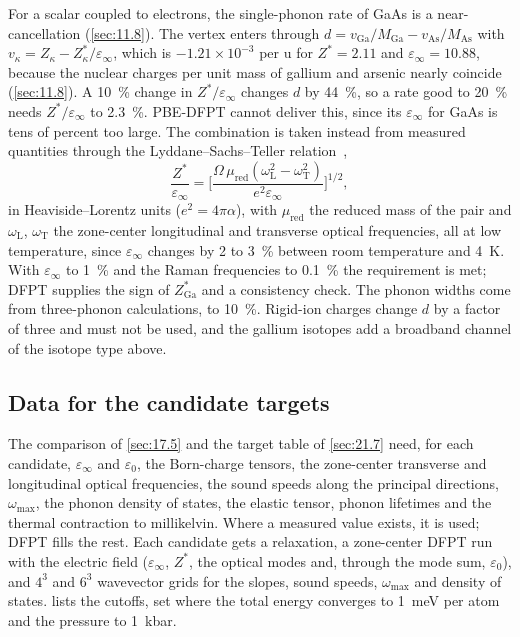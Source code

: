 For a scalar coupled to electrons, the single-phonon rate of GaAs is a near-cancellation (\cref{sec:11.8}). The vertex enters through $d = v_{\mathrm{Ga}}/M_{\mathrm{Ga}} - v_{\mathrm{As}}/M_{\mathrm{As}}$ with $v_\kappa = Z_\kappa - Z^*_\kappa/\varepsilon_\infty$, which is $-1.21\times10^{-3}$ per u for $Z^* = 2.11$ and $\varepsilon_\infty = 10.88$, because the nuclear charges per unit mass of gallium and arsenic nearly coincide (\cref{sec:11.8}). A \SI{10}{\percent} change in $Z^*/\varepsilon_\infty$ changes $d$ by \SI{44}{\percent}, so a rate good to \SI{20}{\percent} needs $Z^*/\varepsilon_\infty$ to \SI{2.3}{\percent}. PBE-DFPT cannot deliver this, since its $\varepsilon_\infty$ for GaAs is tens of percent too large. The combination is taken instead from measured quantities through the Lyddane--Sachs--Teller relation~\cite{lyddane1941polar},
\begin{equation}
  \frac{Z^*}{\varepsilon_\infty} = \Big[\frac{\Omega\,\mu_{\mathrm{red}}(\omega_{\mathrm{L}}^2 - \omega_{\mathrm{T}}^2)}{e^2\varepsilon_\infty}\Big]^{1/2} ,
  \label{eq:E.17-lst}
\end{equation}
in Heaviside--Lorentz units ($e^2 = 4\pi\alpha$), with $\mu_{\mathrm{red}}$ the reduced mass of the pair and $\omega_{\mathrm{L}}$, $\omega_{\mathrm{T}}$ the zone-center longitudinal and transverse optical frequencies, all at low temperature, since $\varepsilon_\infty$ changes by 2 to \SI{3}{\percent} between room temperature and \SI{4}{K}. With $\varepsilon_\infty$ to \SI{1}{\percent} and the Raman frequencies to \SI{0.1}{\percent} the requirement is met; DFPT supplies the sign of $Z^*_{\mathrm{Ga}}$ and a consistency check. The phonon widths come from three-phonon calculations, to \SI{10}{\percent}. Rigid-ion charges change $d$ by a factor of three and must not be used, and the gallium isotopes add a broadband channel of the isotope type above.

\subsection{Data for the candidate targets}

The comparison of \cref{sec:17.5} and the target table of \cref{sec:21.7} need, for each candidate, $\varepsilon_\infty$ and $\varepsilon_0$, the Born-charge tensors, the zone-center transverse and longitudinal optical frequencies, the sound speeds along the principal directions, $\omega_{\mathrm{max}}$, the phonon density of states, the elastic tensor, phonon lifetimes and the thermal contraction to millikelvin. Where a measured value exists, it is used; DFPT fills the rest. Each candidate gets a relaxation, a zone-center DFPT run with the electric field ($\varepsilon_\infty$, $Z^*$, the optical modes and, through the mode sum, $\varepsilon_0$), and $4^3$ and $6^3$ wavevector grids for the slopes, sound speeds, $\omega_{\mathrm{max}}$ and density of states.  lists the cutoffs, set where the total energy converges to \SI{1}{meV} per atom and the pressure to \SI{1}{kbar}.


